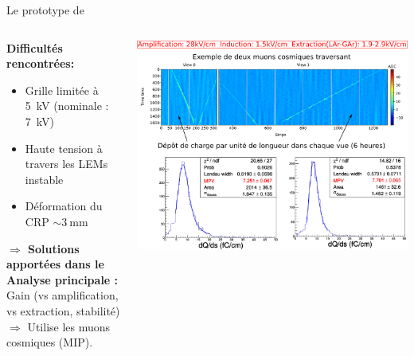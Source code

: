     \begin{frame}{Le prototype de \TOO{}}
       	\begin{scriptsize}
       		\vfill
       		\begin{columns}
       			\begin{column}{0.35\textwidth}
       				\textbf{Difficultés rencontrées:} 
       				\begin{itemize}
       					\item Grille limitée à \SI{5}{\kilo\volt} (nominale : \SI{7}{\kilo\volt})
       					\item Haute tension à travers les LEMs instable
       					\item Déformation du CRP $\sim\SI{3}{\milli\meter}$
       				\end{itemize}
       				\textbf{$\Rightarrow$ Solutions apportées dans le \SSS{}} \\
       				\vspace{0.3cm}
       				\textbf{Analyse principale :} Gain (vs amplification, vs extraction, stabilité)\\
       				$\Rightarrow$ Utilise les muons cosmiques (MIP).
       			\end{column}\hfill
       			\begin{column}{0.65\textwidth}
       				\includegraphics[width=\textwidth]{./pictures/run840.png}\\
       			\end{column}
       		\end{columns}
	    \end{scriptsize}
    \end{frame}

